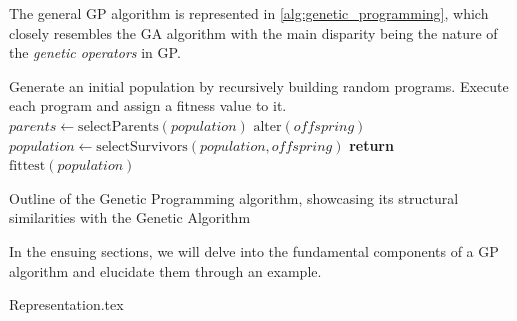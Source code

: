   The general GP algorithm is represented in \vref{alg:genetic_programming}, which
  closely resembles the GA algorithm with the main disparity being the nature of
  the \textit{genetic operators} in GP.

  \begin{algorithm}[ht!]
    \begin{algorithmic}[1]
      \State Generate an initial population by recursively building random programs.
      \State Execute each program and assign a fitness value to it.
      \Repeat
        \State \(\mathit{parents} \gets \mathrm{selectParents}(\mathit{population})\) 
        \State \(\mathrm{alter}(\mathit{offspring})\) 
        \State \(\mathit{population} \gets \mathrm{selectSurvivors}(
          \mathit{population}, \mathit{offspring})\) 
      \State \textbf{return} \(\mathrm{fittest}(\mathit{population})\) 
    \end{algorithmic}
    \caption{
      Outline of the Genetic Programming algorithm, showcasing its structural 
      similarities with the Genetic Algorithm
    }
    \label{alg:genetic_programming}
  \end{algorithm}

  In the ensuing sections, we will delve into the fundamental components of a GP
  algorithm and elucidate them through an example.

  {Representation.tex}
%
